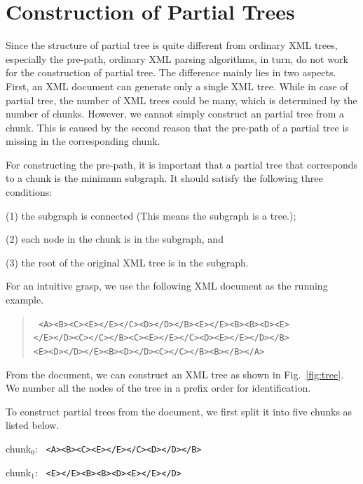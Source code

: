 
\def\INDEXSET#1{\mathit{#1}_{[P]}}
\def\baselinestretch{1.5}

\section{Construction of Partial Trees}
\label{sec:construction}

Since the structure of partial tree is quite different from ordinary XML trees,
especially the pre-path, ordinary XML parsing algorithms, in turn, do not work
for the construction of partial tree. The difference mainly lies in two aspects.
First, an XML document can generate only a single XML tree. While in case of
partial tree, the number of XML trees could be many, which is determined by the
number of chunks. However, we cannot simply construct an partial tree from a
chunk. This is caused by the second reason that the pre-path of a partial tree
is missing in the corresponding chunk.

For constructing the pre-path, it is important that a partial tree that
corresponds to a chunk is the minimum subgraph. It should satisfy the following
three conditions:

(1) the subgraph is connected (This means the subgraph is a tree.);

(2) each node in the chunk is in the subgraph, and

(3) the root of the original XML tree is in the subgraph.

For an intuitive grasp, we use the following XML document as the running
example.

\begin{quote}\tt\small
<A><B><C><E></E></C><D></D></B><E></E><B><B><D><E>\\
</E></D><C></C></B><C><E></E></C><D><E></E></D></B>\\
<E><D></D></E><B><D></D><C></C></B><B></B></A>\\
\end{quote}

From the document, we can construct an XML tree as shown in Fig.~\ref{fig:tree}.
We number all the nodes of the tree in a prefix order for identification.



To construct partial trees from the document, we first split it into five chunks
as listed below.

 chunk$_0$: \texttt{ <A><B><C><E></E></C><D></D></B>}

 chunk$_1$: \texttt{ <E></E><B><B><D><E></E></D>}


